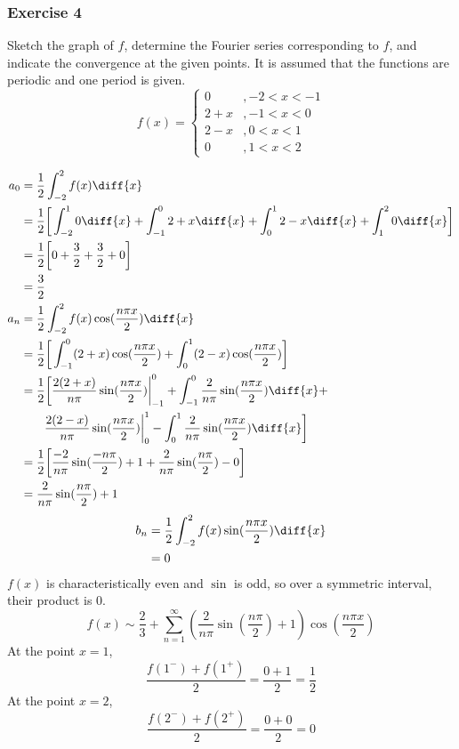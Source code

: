 \documentclass{math}
\begin{document}
\subsubsection*{Exercise 4}
Sketch the graph of \( f \), determine the Fourier series corresponding to
\( f \), and indicate the convergence at the given points. It is assumed that
the functions are periodic and one period is given.
\[ f(x) = \begin{cases}
  0 &, -2<x<-1 \\
  2+x &, -1<x<0 \\
  2-x &, 0<x<1 \\
  0 &, 1<x<2
\end{cases} \]
\begin{center}
\end{center}
\begin{align*}
  a_0 &= \frac{1}{2}\int_{-2}^{2}f(x)\diff{x} \\
  &= \frac{1}{2}\bigg[\int_{-2}^{1}0\diff{x}+\int_{-1}^{0}2+x\diff{x}+
    \int_{0}^{1}2-x\diff{x}+\int_{1}^{2}0\diff{x}\bigg] \\
  &= \frac{1}{2}\bigg[0+\frac{3}{2}+\frac{3}{2}+0\bigg] \\
  &= \frac{3}{2} \\
  a_n &= \frac{1}{2}\int_{-2}^{2}f(x)\cos(\frac{n\pi x}{2})\diff{x} \\
  &= \frac{1}{2}\bigg[\int_{-1}^{0}(2+x)\cos(\frac{n\pi x}{2})+
    \int_{0}^{1}(2-x)\cos(\frac{n\pi x}{2})\bigg] \\
  &= \frac{1}{2}\bigg[
    \frac{2(2+x)}{n\pi}\sin(\frac{n\pi x}{2})\bigg|_{-1}^0+
    \int_{-1}^{0}\frac{2}{n\pi}\sin(\frac{n\pi x}{2})\diff{x}+ \\
  & \quad \quad \frac{2(2-x)}{n\pi}\sin(\frac{n\pi x}{2})\bigg|_{0}^{1}-
    \int_{0}^{1}\frac{2}{n\pi}\sin(\frac{n\pi x}{2})\diff{x}
  \bigg] \\
  &= \frac{1}{2}\bigg[\frac{-2}{n\pi}\sin(\frac{-n\pi}{2})+1+
    \frac{2}{n\pi}\sin(\frac{n\pi}{2})-0\bigg] \\
  &= \frac{2}{n\pi}\sin(\frac{n\pi}{2})+1
\end{align*}
\begin{align*}
  b_n &= \frac{1}{2}\int_{-2}^{2}f(x)\sin(\frac{n\pi x}{2})\diff{x} \\
  &= 0
\end{align*}
\( f(x) \) is characteristically even and \( \sin \) is odd, so over a
symmetric interval, their product is 0.
\[ f(x) \sim \frac{2}{3}+\sum_{n=1}^{\infty}
  (\frac{2}{n\pi}\sin(\frac{n\pi}{2})+1)\cos(\frac{n\pi x}{2}) \]
At the point \( x = 1 \),
\[ \frac{f(1^-)+f(1^+)}{2} = \frac{0+1}{2} = \frac{1}{2} \]
At the point \( x = 2 \),
\[ \frac{f(2^-)+f(2^+)}{2} = \frac{0+0}{2} = 0 \]
\end{document}
